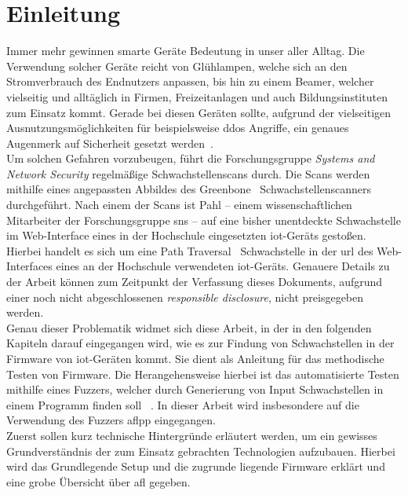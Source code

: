 \section{Einleitung}\label{sec:einleitung}
Immer mehr gewinnen smarte Geräte Bedeutung in unser aller Alltag.
Die Verwendung solcher Geräte reicht von Glühlampen, welche sich an den Stromverbrauch des Endnutzers anpassen,
bis hin zu einem Beamer, welcher vielseitig und alltäglich in Firmen, Freizeitanlagen und auch Bildungsinstituten zum
Einsatz kommt.
Gerade bei diesen Geräten sollte, aufgrund der vielseitigen Ausnutzungsmöglichkeiten für beispielsweise \gls{ddos} Angriffe,
ein genaues Augenmerk auf Sicherheit gesetzt werden~\cite{iot-exploitations}. \\
Um solchen Gefahren vorzubeugen, führt die Forschungsgruppe \textit{Systems and Network Security} regelmäßige Schwachstellenscans durch.
Die Scans werden mithilfe eines angepassten Abbildes des Greenbone~\cite{greenbone} Schwachstellenscanners durchgeführt.
Nach einem der Scans ist Pahl -- einem wissenschaftlichen Mitarbeiter der Forschungsgruppe \gls{sns}\cite{sns} -- auf eine
bisher unentdeckte Schwachstelle im Web-Interface eines in der Hochschule eingesetzten \gls{iot}-Geräts gestoßen.
Hierbei handelt es sich um eine Path Traversal~\cite{path-traversal} Schwachstelle in der \gls{url} des Web-Interfaces eines
an der Hochschule verwendeten \gls{iot}-Geräts.
Genauere Details zu der Arbeit können zum Zeitpunkt der Verfassung dieses Dokuments, aufgrund einer noch nicht
abgeschlossenen \textit{responsible disclosure}, nicht preisgegeben werden.\\
\linebreak
Genau dieser Problematik widmet sich diese Arbeit, in der in den folgenden Kapiteln darauf eingegangen wird, wie es zur Findung von Schwachstellen
in der Firmware von \gls{iot}-Geräten kommt.
Sie dient als Anleitung für das methodische Testen von Firmware.
Die Herangehensweise hierbei ist das automatisierte Testen mithilfe eines Fuzzers, welcher durch Generierung von Input
Schwachstellen in einem Programm finden soll ~\cite{fuzzing}.
In dieser Arbeit wird insbesondere auf die Verwendung des Fuzzers \gls{aflpp} eingegangen.\\
\linebreak
Zuerst sollen kurz technische Hintergründe erläutert werden, um ein gewisses Grundverständnis der zum Einsatz gebrachten
Technologien aufzubauen.
Hierbei wird das Grundlegende Setup und die zugrunde liegende Firmware erklärt und eine grobe Übersicht über
\gls{afl}\cite{afl} gegeben.
